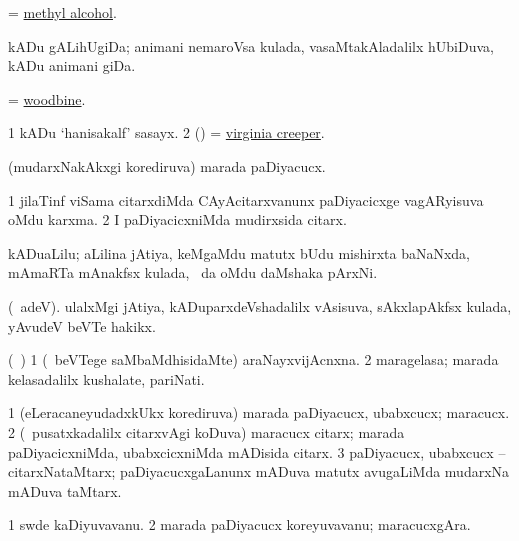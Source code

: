 \bentry
{} 
\gl{\nA}
\expl{}
\bmng
= \hyperref{kandict_m.pdf}{M}{methyl alcohol}{methyl alcohol}. 
\emng
\eentry

\bentry
{} 
\gl{\nA}
\expl{}
\bmng
kADu gALihUgiDa; animani nemaroVsa kulada, vasaMtakAladalilx hUbiDuva, kADu animani giDa. 
\emng
\eentry

\bentry
{} 
\gl{\nA}
\expl{}
\bmng
= \hyperlink{woodbine}{woodbine}. 
\emng
\eentry

\bentry
{} 
\gl{\nA}
\expl{}
\bmng
\bnum
\num{1} kADu `hanisakalf' sasayx. 
\num{2} (\ame) = \hyperref{kandict_v.pdf}{V}{Virginia creeper}{virginia creeper}. 
\enum
\emng
\eentry

\bentry 
{} 
\gl{\nA}
\expl{}
\bmng
(mudarxNakAkxgi korediruva) marada paDiyacucx. 
\emng
\eentry

\bentry
{} 
\gl{\nA}
\expl{}
\bmng
\bnum
\num{1} jilaTinf viSama citarxdiMda CAyAcitarxvanunx paDiyacicxge vagARyisuva oMdu karxma. 
\num{2} I paDiyacicxniMda mudirxsida citarx. 
\enum
\emng
\eentry

\bentry
{} 
\gl{\nA}
\expl{}
\bmng
kADuaLilu; aLilina jAtiya, keMgaMdu matutx bUdu mishirxta baNaNxda, mAmaRTa mAnakfsx kulada, \kanu\ \ame da oMdu daMshaka pArxNi. 
\emng
\eentry

\bentry
{} 
\gl{\nA}
\expl{}
\bmng
(\bava\ adeV). ulalxMgi jAtiya, kADuparxdeVshadalilx vAsisuva, sAkxlapAkfsx kulada, yAvudeV beVTe hakikx. 
\emng
\eentry

\bentry
{} 
\gl{\nA}
\expl{}
\bmng
(\kanmu\ \ame) 
\bnum
\num{1} (\kanmu\ beVTege saMbaMdhisidaMte) araNayxvijAcnxna. 
\num{2} maragelasa; marada kelasadalilx kushalate, pariNati. 
\enum
\emng
\eentry

\bentry
{} 
\gl{\nA}
\expl{}
\bmng
\bnum
\num{1} (eLeracaneyudadxkUkx korediruva) marada paDiyacucx, ubabxcucx; maracucx. 
\num{2} (\kanmu\ pusatxkadalilx citarxvAgi koDuva) maracucx citarx; marada paDiyacicxniMda, ubabxcicxniMda mADisida citarx. 
\num{3} paDiyacucx, ubabxcucx -- citarxNataMtarx; paDiyacucxgaLanunx mADuva matutx avugaLiMda mudarxNa mADuva taMtarx. 
\enum
\emng
\eentry

\bentry
{} 
\gl{\nA}
\expl{}
\bmng
\bnum
\num{1} swde kaDiyuvavanu. 
\num{2} marada paDiyacucx koreyuvavanu; maracucxgAra. 
\enum
\emng
\eentry

